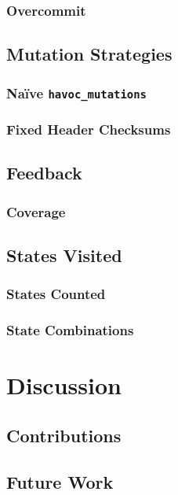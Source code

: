 \documentclass{article}
\begin{document}
\begin{multicols}{2}
  \subsubsection{Overcommit}

  \subsection{Mutation Strategies}

  \subsubsection{Naïve \texttt{havoc\_mutations}}

  \subsubsection{Fixed Header Checksums}

  \subsection{Feedback}

  \subsubsection{Coverage}

  \subsection{States Visited}

  \subsubsection{States Counted}

  \subsubsection{State Combinations}

  \section{Discussion}

  \subsection{Contributions}

  \subsection{Future Work}

\end{multicols}
\end{document}
